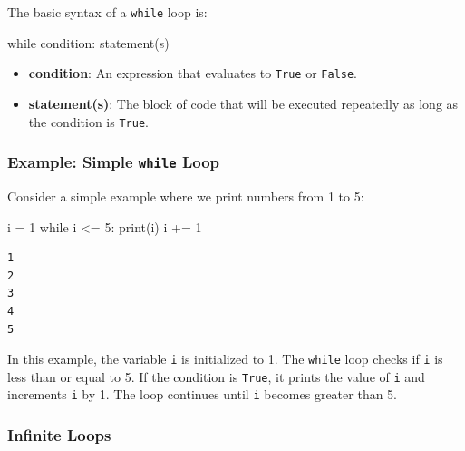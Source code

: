 \documentclass[
  letterpaper,
  DIV=11,
  numbers=noendperiod]{scrreprt}
\newenvironment{Shaded}{\begin{snugshade}}{\end{snugshade}}
\newcommand{\BuiltInTok}[1]{\textcolor[rgb]{0.00,0.23,0.31}{#1}}
\newcommand{\ControlFlowTok}[1]{\textcolor[rgb]{0.00,0.23,0.31}{#1}}
\newcommand{\DecValTok}[1]{\textcolor[rgb]{0.68,0.00,0.00}{#1}}
\newcommand{\NormalTok}[1]{\textcolor[rgb]{0.00,0.23,0.31}{#1}}
\newcommand{\OperatorTok}[1]{\textcolor[rgb]{0.37,0.37,0.37}{#1}}
\providecommand{\tightlist}{%
  \setlength{\itemsep}{0pt}\setlength{\parskip}{0pt}}\usepackage{longtable,booktabs,array}
\begin{document}
The basic syntax of a \texttt{while} loop is:

\begin{Shaded}
\begin{Highlighting}[]
\ControlFlowTok{while}\NormalTok{ condition:}
\NormalTok{    statement(s)}
\end{Highlighting}
\end{Shaded}

\begin{itemize}
\tightlist
\item
  \textbf{condition}: An expression that evaluates to \texttt{True} or
  \texttt{False}.
\item
  \textbf{statement(s)}: The block of code that will be executed
  repeatedly as long as the condition is \texttt{True}.
\end{itemize}

\hypertarget{example-simple-while-loop}{%
\subsubsection{\texorpdfstring{Example: Simple \texttt{while}
Loop}{Example: Simple while Loop}}\label{example-simple-while-loop}}

Consider a simple example where we print numbers from 1 to 5:

\begin{Shaded}
\begin{Highlighting}[]
\NormalTok{i }\OperatorTok{=} \DecValTok{1}
\ControlFlowTok{while}\NormalTok{ i }\OperatorTok{\textless{}=} \DecValTok{5}\NormalTok{:}
    \BuiltInTok{print}\NormalTok{(i)}
\NormalTok{    i }\OperatorTok{+=} \DecValTok{1}
\end{Highlighting}
\end{Shaded}

\begin{verbatim}
1
2
3
4
5
\end{verbatim}

In this example, the variable \texttt{i} is initialized to 1. The
\texttt{while} loop checks if \texttt{i} is less than or equal to 5. If
the condition is \texttt{True}, it prints the value of \texttt{i} and
increments \texttt{i} by 1. The loop continues until \texttt{i} becomes
greater than 5.

\hypertarget{infinite-loops}{%
\subsubsection{Infinite Loops}\label{infinite-loops}}
\end{document}
